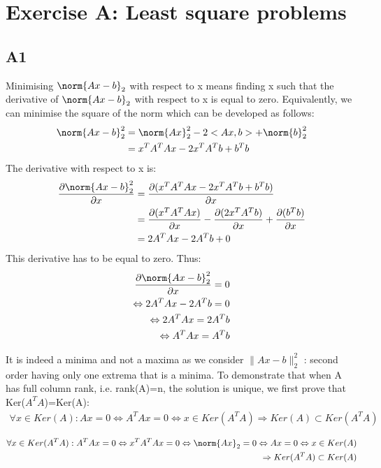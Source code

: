 \documentclass[11pt]{article}
\newcommand{\snorm}[1]{\norm{#1}_2} %
\begin{document}
\section*{Exercise A: Least square problems}
\subsection*{A1}
Minimising $\snorm{Ax - b}$ with respect to x means finding x such that the derivative of $\snorm{Ax - b}$ with respect to x is equal to zero. Equivalently, we can minimise the square of the norm which can be developed as follows:
\begin{align*}
    \snorm{Ax - b}^2 &= \snorm{Ax}^2 - 2 <Ax,b> + \snorm{b}^2 \\
    &= x^{T}A^{T}Ax - 2x^{T}A^{T}b + b^{T}b 
\end{align*}
The derivative with respect to x is: \\
\begin{align*}
    \frac{\partial \snorm{Ax - b}^2}{\partial x} &= \frac{\partial(x^{T}A^{T}Ax - 2x^{T}A^{T}b + b^{T}b)}{\partial x} \\
    &= \frac{\partial(x^{T}A^{T}Ax)}{\partial x} - \frac{\partial(2x^{T}A^{T}b)}{\partial x} + \frac{\partial(b^{T}b)}{\partial x} \\
    &= 2A^{T}Ax - 2A^{T}b + 0
\end{align*}
This derivative has to be equal to zero. Thus: \\
\begin{align*}
    \frac{\partial \snorm{Ax - b}^2}{\partial x} = 0 \\
    \Leftrightarrow 2A^{T}Ax - 2A^{T}b = 0 \\
    \Leftrightarrow 2A^{T}Ax = 2A^{T}b \\
    \Leftrightarrow A^{T}Ax = A^{T}b
\end{align*}

It is indeed a minima and not a maxima as we consider $\|Ax-b\|_2^2$ : second order having only one extrema that is a minima.
To demonstrate that when A has full column rank, i.e. rank(A)=n, the solution is unique, we first prove that Ker($A^{T}A$)=Ker(A): \\
\begin{align*}
    \forall x \in Ker(A): Ax = 0 \Leftrightarrow A^{T}Ax = 0 \Leftrightarrow x \in Ker(A^{T}A) \Rightarrow Ker(A) \subset Ker(A^{T}A)
\end{align*}

\begin{align*}
    \forall x \in Ker(A^{T}A): A^{T}Ax = 0 \Leftrightarrow x^{T}A^{T}Ax = 0 \Leftrightarrow \snorm{Ax} = 0 \Leftrightarrow Ax = 0 \Leftrightarrow x \in Ker(A) \\
    \Rightarrow Ker(A^{T}A) \subset Ker(A)
\end{align*}
\end{document}
